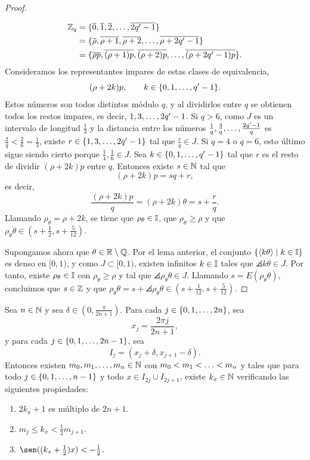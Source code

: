 \documentclass[a4paper, 12pt, oneside]{book}
\begin{document}
\begin{proof}
\begin{itemize}
        \begin{align*}
            \mathbb Z_q &= \{\overline{0},\overline{1},\overline{2},\mathellipsis,\overline{2q'-1}\} \\
        &= \{\overline{\rho},\overline{\rho+1},\overline{\rho+2},\mathellipsis,\overline{\rho+2q'-1}\} \\
        &= \{\overline{\rho p},\overline{(\rho+1)p},\overline{(\rho+2)p},\mathellipsis,\overline{(\rho+2q'-1)p}\}.
        \end{align*}
        Consideramos los representantes impares de estas clases de equivalencia,
        \[(\rho+2k)p, \qquad k \in \{0,1,\mathellipsis,q'-1\}.\]
        Estos números son todos distintos módulo $q$, y al dividirlos entre $q$ se obtienen todos los restos impares, es decir, $1,3,\mathellipsis,2q'-1$. Si $q > 6$, como $J$ es un intervalo de longitud $\frac{1}{3}$ y la distancia entre los números $\frac{1}{q},\frac{3}{q},\mathellipsis,\frac{2q'-1}{q}$ es $\frac{2}{q} < \frac{2}{6}=\frac{1}{3}$, existe $r \in \{1,3,\mathellipsis,2q'-1\}$ tal que $\frac{r}{q} \in J$. Si $q = 4$ o $q = 6$, esto último sigue siendo cierto porque $\frac{1}{4},\frac{1}{6} \in J$. Sea $k \in \{0,1,\mathellipsis,q'-1\}$ tal que $r$ es el resto de dividir $(\rho+2k)p$ entre $q$. Entonces existe $s \in \mathbb N$ tal que
        \[(\rho+2k)p = sq+r,\]
        es decir,
        \[\frac{(\rho+2k)p}{q} = (\rho+2k)\theta = s + \frac{r}{q}.\]
        Llamando $\rho_\theta = \rho+2k$, se tiene que $\rho_\theta \in \mathbb I$, que $\rho_\theta \geq \rho$ y que $\rho_\theta\theta \in (s+\frac{1}{2},s+\frac{5}{12})$.
    \end{itemize}

    Supongamos ahora que $\theta \in \mathbb R\setminus\mathbb Q$. Por el lema anterior, el conjunto $\{\langle k\theta \rangle \mid k \in \mathbb I\}$ es denso en $[0,1)$, y como $J \subset [0,1)$, existen infinitos $k \in \mathbb I$ tales que $\angles{k\theta} \in J$. Por tanto, existe $\rho_\theta \in \mathbb I$ con $\rho_\theta \geq \rho$ y tal que $\angles{\rho_\theta\theta} \in J$. Llamando $s = E( \rho_\theta\theta)$, concluimos que $s \in \mathbb Z$ y que $\rho_\theta\theta = s + \angles{\rho_\theta\theta} \in (s +\frac{1}{12},s +\frac{5}{12})$.
\end{proof}

\begin{lemma}
    Sea $n \in \mathbb N$ y sea $\delta \in (0,\frac{\pi}{2n+1})$. Para cada $j \in \{0,1,\mathellipsis,2n\}$, sea
    \[x_j = \frac{2\pi j}{2n+1},\]
    y para cada $j \in \{0,1,\mathellipsis,2n-1\}$, sea \[I_j = (x_j+\delta,x_{j+1}-\delta).\]
    Entonces existen $m_0,m_1,\mathellipsis,m_n \in \mathbb N$ con $m_0 < m_1 < \mathellipsis < m_n$ y tales que para todo $j \in \{0,1,\mathellipsis,n-1\}$ y todo $x \in I_{2j} \cup I_{2j+1}$, existe $k_x \in \mathbb N$ verificando las siguientes propiedades:
    \begin{enumerate}
        \item $2k_x+1$ es múltiplo de $2n+1$.
        \item $m_{j} \leq k_x < \frac{1}{2}m_{j+1}$.
        \item $\sen((k_x+\frac{1}{2})x) < -\frac{1}{2}$.
    \end{enumerate}
\end{lemma}
\end{document}
